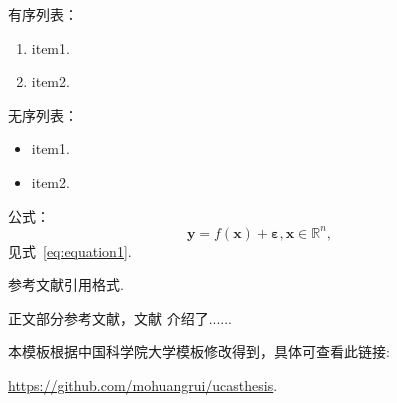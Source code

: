 {{有序列表：
\begin{enumerate}
    \item item1.
    \item item2.
\end{enumerate}

无序列表：
\begin{itemize}
    \item item1.
    \item item2.
\end{itemize}

公式：
\begin{equation}
    \boldsymbol{y} = f(\boldsymbol{x}) + \boldsymbol{\varepsilon}, \boldsymbol{x}\in\mathbb{R}^n, \label{eq:equation1}
\end{equation}
见式~\eqref{eq:equation1}.

参考文献引用格式\cite{journal, inproceedings, book}.

正文部分参考文献，文献  介绍了......

\vspace*{2cm}
{\colorbox[rgb]{0.9,0.6,0.2}{本模板根据中国科学院大学模板修改得到，具体可查看此链接:}}

{\colorbox[rgb]{0.9,0.6,0.2}{\href{https://github.com/mohuangrui/ucasthesis}{https://github.com/mohuangrui/ucasthesis}.}}


}
}
